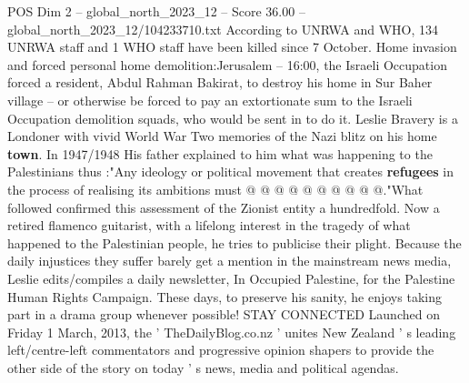 \begin{textsample}{POS Dim 2 – global\_north\_2023\_12 – Score 36.00 – global\_north\_2023\_12/104233710.txt}
According to UNRWA and WHO, 134 UNRWA staff and 1 WHO staff have been killed since 7 October.
Home invasion and forced personal home demolition:Jerusalem -- 16:00, the Israeli Occupation forced a resident, Abdul Rahman Bakirat, to destroy his home in Sur Baher village -- or otherwise be forced to pay an extortionate sum to the Israeli Occupation demolition squads, who would be sent in to do it.
Leslie Bravery is a Londoner with vivid World War Two memories of the Nazi blitz on his home \textbf{town}.
In 1947/1948 His father explained to him what was happening to the Palestinians thus :"Any ideology or political movement that creates \textbf{refugees} in the process of realising its ambitions must @ @ @ @ @ @ @ @ @ @."What followed confirmed this assessment of the Zionist entity a hundredfold.
Now a retired flamenco guitarist, with a lifelong interest in the tragedy of what happened to the Palestinian people, he tries to publicise their plight.
Because the daily injustices they suffer barely get a mention in the mainstream news media, Leslie edits/compiles a daily newsletter, In Occupied Palestine, for the Palestine Human Rights Campaign.
These days, to preserve his sanity, he enjoys taking part in a drama group whenever possible!
STAY CONNECTED Launched on Friday 1 March, 2013, the ' TheDailyBlog.co.nz ' unites New Zealand ' s leading left/centre-left commentators and progressive opinion shapers to provide the other side of the story on today ' s news, media and political agendas.

\end{textsample}
